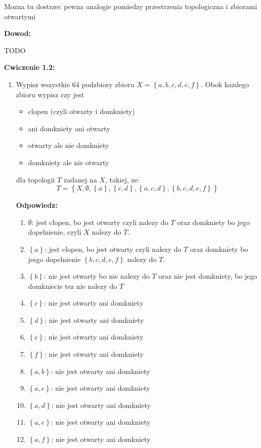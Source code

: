 \documentclass{article}
\begin{document}
Mozna tu dostrzec pewna analogie pomiedzy przestrzenia topologiczna i zbiorami otwartymi

\textbf{Dowod:}

TODO

\hrulefill


\textbf{Cwiczenie 1.2:}
\begin{enumerate}%

\item Wypisz wszystkie 64 podzbiory zbioru $X = \left\{a,b,c,d,e,f \right\}$. Obok kazdego zbioru wypisz czy jest 
    \begin{itemize}
        \item clopen (czyli otwarty i domkniety)
        \item ani domkniety ani otwarty
        \item otwarty ale nie domkniety
        \item domkniety ale nie otwarty
    \end{itemize}
dla topologii $T$ zadanej na $X$, takiej, ze: $$T = \left\{ X, \emptyset, \left\{ a \right\}, \left\{ c,d \right\}, \left\{ a,c,d \right\}, \left\{ b,c,d,e,f \right\} \right\}$$

\textbf{Odpowiedz:}
\begin{enumerate}[label=\arabic*.] %
    
\item $\emptyset$: jest clopen, bo jest otwarty czyli nalezy do $T$ oraz domkniety bo jego dopelnienie, czyli $X$ nalezy do $T$.
\item $\left\{ a \right\}$: jest clopen, bo jest otwarty czyli nalezy do $T$ oraz domkniety bo jesgo dopelnienie $\left\{ b,c,d,e,f \right\}$ nalezy do $T$.
\item $\left\{ b \right\}$: nie jest otwarty bo nie nalezy do $T$ oraz nie jest domkniety, bo jego domkniecie tez nie nalezy do $T$
\item $\left\{ c \right\}$: nie jest otwarty ani domkniety
\item $\left\{ d \right\}$: nie jest otwarty ani domkniety
\item $\left\{ e \right\}$: nie jest otwarty ani domkniety
\item $\left\{ f \right\}$: nie jest otwarty ani domkniety

\item $\left\{ a,b \right\}$: nie jest otwarty ani domkniety
\item $\left\{ a,c \right\}$: nie jest otwarty ani domkniety
\item $\left\{ a,d \right\}$: nie jest otwarty ani domkniety
\item $\left\{ a,e \right\}$: nie jest otwarty ani domkniety
\item $\left\{ a,f \right\}$: nie jest otwarty ani domkniety


\end{enumerate}
\end{enumerate}
\end{document}
